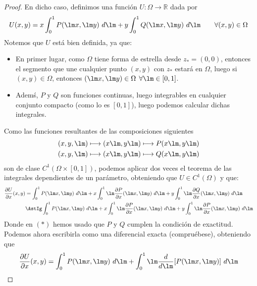 \begin{teo}
\begin{proof}
        En dicho caso, definimos una función $U:\Omega\rightarrow\mathbb{R}$ dada por
        \begin{equation*}
            U(x,y) = x\int_{0}^{1} P(\lm x,\lm y)~d\lm + y\int_{0}^{1} Q(\lm x,\lm y)~d\lm  \qquad \forall (x,y)\in \Omega
        \end{equation*}
        Notemos que $U$ está bien definida, ya que: 
        \begin{itemize}
            \item En primer lugar, como $\Omega$ tiene forma de estrella desde $z_\ast = (0,0)$, entonces el segmento que une cualquier punto $(x,y)$ con $z_\ast$ estará en $\Omega$, luego si $(x,y)\in \Omega$, entonces $(\lm x,\lm y)\in \Omega$ $\forall \lm\in [0,1]$.
            \item Ademś, $P$ y $Q$ son funciones continuas, luego integrables en cualquier conjunto compacto (como lo es $[0,1]$), luego podemos calcular dichas integrales.
        \end{itemize}
        Como las funciones resultantes de las composiciones siguientes
        \begin{gather*}
            (x,y,\lm) \longmapsto (x\lm, y\lm) \longmapsto P(x\lm, y\lm) \\
            (x,y,\lm) \longmapsto (x\lm, y\lm) \longmapsto Q(x\lm, y\lm) 
        \end{gather*}
        son de clase $C^1(\Omega\times [0,1])$, podemos aplicar dos veces el teorema de las integrales dependientes de un parámetro, obteniendo que $U\in C^1(\Omega)$ y que:
        \begin{align*}
            \dfrac{\partial U}{\partial x}(x,y) &= \int_{0}^{1} P(\lm x,\lm y)~d\lm  + x\int_{0}^{1} \lm \dfrac{\partial P}{\partial x}(\lm x,\lm y)~d\lm  + y\int_{0}^{1} \lm\dfrac{\partial Q}{\partial x}(\lm x,\lm y)~d\lm  \\
                                                &\AstIg \int_{0}^{1} P(\lm x,\lm y)~d\lm  + x\int_{0}^{1} \lm \dfrac{\partial P}{\partial x}(\lm x,\lm y)~d\lm  + y\int_{0}^{1} \lm\dfrac{\partial P}{\partial x}(\lm x,\lm y)~d\lm  
        \end{align*}
        Donde en $(\ast)$ hemos usado que $P$ y $Q$ cumplen la condición de exactitud. Podemos ahora escribirla como una diferencial exacta (compruébese), obteniendo que
        \begin{equation*}
            \dfrac{\partial U}{\partial x}(x,y) = \int_{0}^{1} P(\lm x,\lm y)~d\lm  + \int_{0}^{1} \lm\dfrac{d}{d\lm}[P(\lm x,\lm y)]~d\lm 
        \end{equation*}

\end{proof}
\end{teo}
